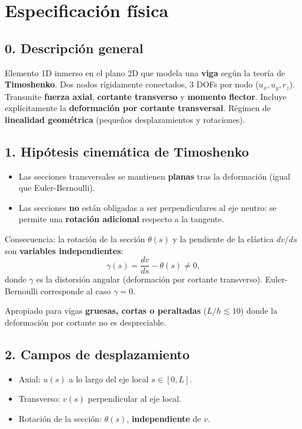 \documentclass[11pt,letterpaper,oneside]{report}
\begin{document}
\section{Especificación física}

\subsection{0. Descripción general}
Elemento 1D inmerso en el plano 2D que modela una \textbf{viga} según la teoría de \textbf{Timoshenko}. Dos nodos rígidamente conectados, 3 DOFs por nodo ($u_x, u_y, r_z$). Transmite \textbf{fuerza axial}, \textbf{cortante transverso} y \textbf{momento flector}. Incluye explícitamente la \textbf{deformación por cortante transversal}. Régimen de \textbf{linealidad geométrica} (pequeños desplazamientos y rotaciones).

\subsection{1. Hipótesis cinemática de Timoshenko}
\begin{itemize}
  \item Las secciones transversales se mantienen \textbf{planas} tras la deformación (igual que Euler-Bernoulli).
  \item Las secciones \textbf{no} están obligadas a ser perpendiculares al eje neutro: se permite una \textbf{rotación adicional} respecto a la tangente.
\end{itemize}

Consecuencia: la rotación de la sección $\theta(s)$ y la pendiente de la elástica $dv/ds$ son \textbf{variables independientes}:
\[
\gamma(s) = \frac{dv}{ds} - \theta(s) \neq 0,
\]
donde $\gamma$ es la distorsión angular (deformación por cortante transverso). Euler-Bernoulli corresponde al caso $\gamma = 0$.

Apropiado para vigas \textbf{gruesas, cortas o peraltadas} ($L/h \lesssim 10$) donde la deformación por cortante no es despreciable.

\subsection{2. Campos de desplazamiento}
\begin{itemize}
  \item Axial: $u(s)$ a lo largo del eje local $s \in [0, L]$.
  \item Transverso: $v(s)$ perpendicular al eje local.
  \item Rotación de la sección: $\theta(s)$, \textbf{independiente} de $v$.
\end{itemize}
\end{document}
